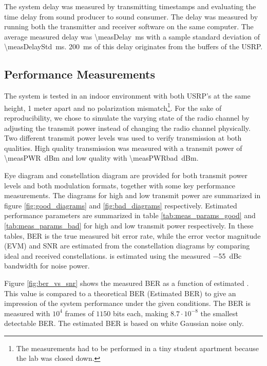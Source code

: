 The system delay was measured by transmitting timestamps and evaluating the time delay from sound producer to sound consumer. The delay was measured by running both the transmitter and receiver software on the same computer. The average measured delay was \SI{\measDelay}{ms} with a sample standard deviation of \SI{\measDelayStd}{ms}. \SI{200}{ms} of this delay originates from the buffers of the USRP.

\subsection{Performance Measurements}
\label{sec:perf_meas}
The system is tested in an indoor environment with both USRP's at the same height, 1 meter apart and no polarization mismatch\footnote{The measurements had to be performed in a tiny student apartment because the lab was closed down.}. For the sake of reproducibility, we chose to simulate the varying state of the radio channel by adjusting the transmit power instead of changing the radio channel physically. Two different transmit power levels was used to verify transmission at both qualities. High quality transmission was measured with a transmit power of \SI{\measPWR}{dBm} and low quality with \SI{\measPWRbad}{dBm}. 

Eye diagram and constellation diagram are provided for both transmit power levels and both modulation formats, together with some key performance measurements. The diagrams for high and low transmit power are summarized in figure \ref{fig:good_diagrams} and \ref{fig:bad_diagrams} respectively. Estimated performance parameters are summarized in table \ref{tab:meas_params_good} and \ref{tab:meas_params_bad} for high and low transmit power respectively. In these tables, BER is the true measured bit error rate, while the error vector magnitude (EVM) and SNR are estimated from the constellation diagrams by comparing ideal and received constellations. \ebnot is estimated using the measured \SI{-55}{dBc} bandwidth for noise power.






Figure \ref{fig:ber_vs_snr} shows the measured BER as a function of estimated \ebnot. This value is compared to a theoretical BER (Estimated BER) to give an impression of the system performance under the given conditions. The BER is measured with $10^4$ frames of $1150$ bits each, making $8.7\cdot10^{-8}$ the smallest detectable BER. The estimated BER is based on white Gaussian noise only.


